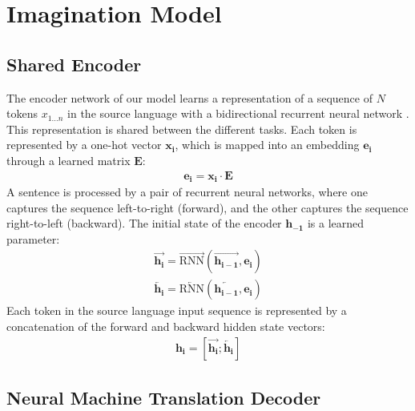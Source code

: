 \section{Imagination Model}

\subsection{Shared Encoder}\label{sec:model:encoder}

The encoder network of our model learns a representation of a
sequence of $N$ tokens $x_{1 \ldots n}$ in the source language with a
bidirectional recurrent neural network \cite{Schuster1997}. This representation is shared between the different tasks. 
Each token is represented by a one-hot vector $\mathbf{x_i}$, which is mapped into an embedding $\mathbf{e_i}$ through a learned matrix
$\mathbf{E}$:
%
\begin{align}
	\mathbf{e_i} = \mathbf{x_i} \cdot \mathbf{E}
\end{align}
%
A sentence is processed by a pair of recurrent neural networks, where one captures the sequence left-to-right (forward), and the other captures the sequence right-to-left (backward). The initial state of the encoder $\mathbf{h_{-1}}$ is a learned parameter:
%
\begin{align}
	\overrightarrow{\mathbf{h_i}} = \overrightarrow{\text{RNN}}(\overrightarrow{\mathbf{h_{i-1}}}, \mathbf{e_i}) \\
    \overleftarrow{\mathbf{h_i}} = \overleftarrow{\text{RNN}}(\overleftarrow{\mathbf{h_{i-1}}}, \mathbf{e_i})
\end{align}
%
Each token in the source language input sequence is represented by a concatenation of the forward and backward hidden state vectors:
%
\begin{align}
	\mathbf{h_i} = [\overrightarrow{\mathbf{h_i}}; \overleftarrow{\mathbf{h_i}}]
\end{align}
%
\subsection{Neural Machine Translation Decoder}

